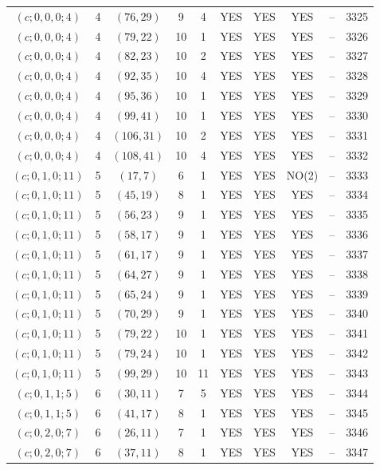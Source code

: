 \begin{longtable}{|c|c|c|c|c|c|c|c|c|c|}
$(c; 0, 0, 0; 4)$ & 4 & $(76, 29)$ & 9 & 4 & YES & YES & YES & -- & 3325\\
$(c; 0, 0, 0; 4)$ & 4 & $(79, 22)$ & 10 & 1 & YES & YES & YES & -- & 3326\\
$(c; 0, 0, 0; 4)$ & 4 & $(82, 23)$ & 10 & 2 & YES & YES & YES & -- & 3327\\
$(c; 0, 0, 0; 4)$ & 4 & $(92, 35)$ & 10 & 4 & YES & YES & YES & -- & 3328\\
$(c; 0, 0, 0; 4)$ & 4 & $(95, 36)$ & 10 & 1 & YES & YES & YES & -- & 3329\\
$(c; 0, 0, 0; 4)$ & 4 & $(99, 41)$ & 10 & 1 & YES & YES & YES & -- & 3330\\
$(c; 0, 0, 0; 4)$ & 4 & $(106, 31)$ & 10 & 2 & YES & YES & YES & -- & 3331\\
$(c; 0, 0, 0; 4)$ & 4 & $(108, 41)$ & 10 & 4 & YES & YES & YES & -- & 3332\\
$(c; 0, 1, 0; 11)$ & 5 & $(17, 7)$ & 6 & 1 & YES & YES & NO(2) & -- & 3333\\
$(c; 0, 1, 0; 11)$ & 5 & $(45, 19)$ & 8 & 1 & YES & YES & YES & -- & 3334\\
$(c; 0, 1, 0; 11)$ & 5 & $(56, 23)$ & 9 & 1 & YES & YES & YES & -- & 3335\\
$(c; 0, 1, 0; 11)$ & 5 & $(58, 17)$ & 9 & 1 & YES & YES & YES & -- & 3336\\
$(c; 0, 1, 0; 11)$ & 5 & $(61, 17)$ & 9 & 1 & YES & YES & YES & -- & 3337\\
$(c; 0, 1, 0; 11)$ & 5 & $(64, 27)$ & 9 & 1 & YES & YES & YES & -- & 3338\\
$(c; 0, 1, 0; 11)$ & 5 & $(65, 24)$ & 9 & 1 & YES & YES & YES & -- & 3339\\
$(c; 0, 1, 0; 11)$ & 5 & $(70, 29)$ & 9 & 1 & YES & YES & YES & -- & 3340\\
$(c; 0, 1, 0; 11)$ & 5 & $(79, 22)$ & 10 & 1 & YES & YES & YES & -- & 3341\\
$(c; 0, 1, 0; 11)$ & 5 & $(79, 24)$ & 10 & 1 & YES & YES & YES & -- & 3342\\
$(c; 0, 1, 0; 11)$ & 5 & $(99, 29)$ & 10 & 11 & YES & YES & YES & -- & 3343\\
$(c; 0, 1, 1; 5)$ & 6 & $(30, 11)$ & 7 & 5 & YES & YES & YES & -- & 3344\\
$(c; 0, 1, 1; 5)$ & 6 & $(41, 17)$ & 8 & 1 & YES & YES & YES & -- & 3345\\
$(c; 0, 2, 0; 7)$ & 6 & $(26, 11)$ & 7 & 1 & YES & YES & YES & -- & 3346\\
$(c; 0, 2, 0; 7)$ & 6 & $(37, 11)$ & 8 & 1 & YES & YES & YES & -- & 3347\\

\end{longtable}
